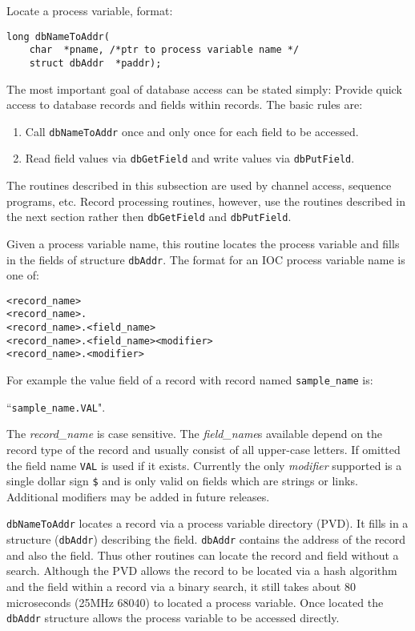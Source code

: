 Locate a process variable, format:

\begin{verbatim}long dbNameToAddr(
    char  *pname, /*ptr to process variable name */
    struct dbAddr  *paddr);
\end{verbatim}The most important goal of database access can be stated simply: Provide quick access to database records and fields 
within records. The basic rules are:

\begin{enumerate}

\item Call \verb|dbNameToAddr| once and only once for each field to be accessed.

\item Read field values via \verb|dbGetField| and write values via \verb|dbPutField|.

\end{enumerate}

The routines described in this subsection are used by channel access, sequence programs, etc. Record processing routines, 
however, use the routines described in the next section rather then \verb|dbGetField| and \verb|dbPutField|.

Given a process variable name, this routine locates the process variable and fills in the fields of structure \verb|dbAddr|. The 
format for an IOC process variable name is one of:

\begin{verbatim}<record_name>
<record_name>.
<record_name>.<field_name>
<record_name>.<field_name><modifier>
<record_name>.<modifier>
\end{verbatim}For example the value field of a record with record named \verb|sample_name| is:

       ``\verb|sample_name.VAL|".

The \emph{record\_name} is case sensitive. The \emph{field\_name}s available depend on the record type of the record and usually consist 
of all upper-case letters. If omitted the field name \verb|VAL| is used if it exists. Currently the only \emph{modifier} supported is a single 
dollar sign \verb|$| and is only valid on fields which are strings or links. Additional modifiers may be added in future releases.

\verb|dbNameToAddr| locates a record via a process variable directory (PVD). It fills in a structure (\verb|dbAddr|) describing the 
field. \verb|dbAddr| contains the address of the record and also the field. Thus other routines can locate the record and field 
without a search. Although the PVD allows the record to be located via a hash algorithm and the field within a record via 
a binary search, it still takes about 80 microseconds (25MHz 68040) to located a process variable. Once located the 
\verb|dbAddr| structure allows the process variable to be accessed directly.

